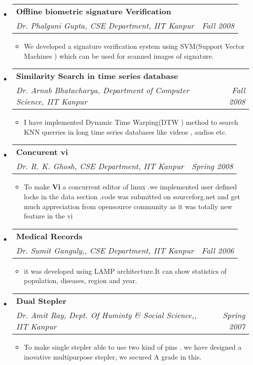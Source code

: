 \documentclass[letterpaper,11pt]{article}
\makeatletter
\newcommand{\resitem}[1]{\item #1 \vspace{-2pt}}
\newcommand{\ressubheading}[4]{
\begin{tabular*}{6.5in}{l@{\extracolsep{\fill}}r}
		\textbf{#1} & #2 \\
		\textit{#3} & \textit{#4} \\
\end{tabular*}\vspace{-6pt}}
\makeatother
\begin{document}
\begin{itemize}
\begin{itemize}
		\end{itemize}				
		
		
			\item	
	\ressubheading{Offline biometric signature Verification}{}{Dr. Phalguni Gupta,  CSE Department, IIT Kanpur}{Fall 2008}	
		\begin{itemize}
		\resitem{We developed a signature verification system using SVM(Support Vector Machines ) which can be used for scanned images of signature. }
		\end{itemize}				
		
		
			\item
	\ressubheading{Similarity Search in time series database}{}{Dr. Arnab Bhatacharya, Department of Computer Science, IIT Kanpur}{Fall 2008}	
		\begin{itemize}
		\resitem{I have implemented Dynamic Time Warping(DTW ) method to  search KNN querries in long time series databases like videos , audios etc.  }
		
		\end{itemize}		
		
		
			\item
		\ressubheading{Concurent vi}{}{Dr. R. K. Ghosh, CSE Department, IIT Kanpur}{Spring 2008}	
		\begin{itemize}
		\resitem{To make \textbf{Vi} a concurrent editor of linux .we implemented user defined locks in the data section .code was submitted on sourceforg.net and get much appreciation from opensource community as it was totally new feature in the vi}
		\end{itemize}	
		
		
			\item
			\ressubheading{Medical Records}{}{Dr. Sumit Ganguly,, CSE Department, IIT Kanpur}{Fall 2006}	
		\begin{itemize}
		\resitem{it was developed using LAMP architecture.It can show statistics of population, diseases, region and  year.}
	
		\end{itemize}	
		

		
			\item
			\ressubheading{Dual Stepler}{}{Dr. Amit Ray, Dept. Of Huminty \& Social Science,, IIT Kanpur}{Spring 2007}	
		\begin{itemize}
		\resitem{To make single stepler able to use two kind of pins . we have  designed a inovative multipurpose stepler, we secured A grade in this.}
		\end{itemize}	
		
\end{itemize}
\end{document}
